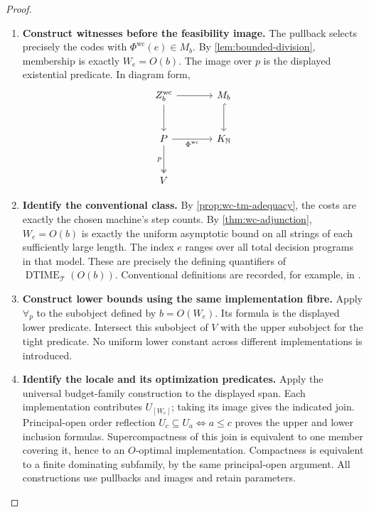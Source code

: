 \documentclass[11pt,a4paper]{article}
\numberwithin{algorithm}{section}
\numberwithin{equation}{section}
\theoremstyle{definition}
\theoremstyle{remark}
\theoremstyle{plain}
\newcommand{\N}{\mathbb N}
\newcommand{\DTIME}{\operatorname{DTIME}}
\theoremstyle{definition}
\theoremstyle{plain}
\begin{document}
\begin{proof}\leavevmode
\begin{enumerate}[leftmargin=*,align=left]
\item \textbf{Construct witnesses before the feasibility image.}
The pullback selects precisely the codes with $\Phi^{\mathrm{wc}}(e)\in M_b$.
By \cref{lem:bounded-division}, membership is exactly
$W_e=O(b)$. The image over $p$ is the displayed existential
predicate. In diagram form,
\[
\begin{tikzcd}[column sep=large,row sep=large]
 Z_b^{\mathrm{wc}} \arrow[r] \arrow[d] &M_b \arrow[d,hook]\\
 P \arrow[r,"\Phi^{\mathrm{wc}}"'] \arrow[d,two heads,"p"'] &K_\N\\
 V&
\end{tikzcd}
\]
\item \textbf{Identify the conventional class.}
By \cref{prop:wc-tm-adequacy}, the costs are exactly the chosen machine's
step counts. By \cref{thm:wc-adjunction}, $W_e=O(b)$ is exactly the
uniform asymptotic bound on all strings of each sufficiently large
length. The index $e$ ranges over all total decision programs in that
model. These are precisely the defining quantifiers of
$\DTIME_{\mathcal T}(O(b))$. Conventional definitions are recorded,
for example, in \citet[Chapter 13]{BarakRunningTime}.
\item \textbf{Construct lower bounds using the same implementation fibre.}
Apply $\forall_p$ to the subobject defined by $b=O(W_e)$.
Its formula is the displayed lower predicate. Intersect this subobject
of $V$ with the upper subobject for the tight predicate. No uniform lower
constant across different implementations is introduced.
\item \textbf{Identify the locale and its optimization predicates.}
Apply the universal budget-family construction to the displayed
span. Each implementation contributes $U_{[W_e]}$; taking its image
gives the indicated join. Principal-open order reflection
$U_c\subseteq U_a\iff a\le c$ proves the upper and lower inclusion
formulas. Supercompactness of this join is equivalent to one member
covering it, hence to an $O$-optimal implementation. Compactness is
equivalent to a finite dominating subfamily, by the same principal-open
argument. All constructions use pullbacks and images and retain parameters.
\end{enumerate}
\end{proof}
\end{document}
